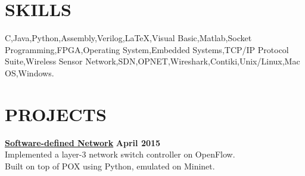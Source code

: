 \documentclass[margin,line]{resume}
\begin{document}
\begin{resume}
\sectionline

    \section{\mysidestyle \textbf{\large{S}\small{KILLS}}}

    C,\hspace{2mm}Java,\hspace{2mm}Python,\hspace{2mm}Assembly,\hspace{2mm}Verilog,\hspace{2mm}\LaTeX,\hspace{2mm}Visual Basic,\hspace{2mm}Matlab,\hspace{2mm}Socket Programming,\hspace{2mm}FPGA,\hspace{2mm}Operating System,\hspace{2mm}Embedded Systems,\hspace{2mm}TCP/IP Protocol Suite,\hspace{2mm}Wireless Sensor Network,\hspace{2mm}SDN,\hspace{2mm}OPNET,\hspace{2mm}Wireshark,\hspace{2mm}Contiki,\hspace{2mm}Unix/Linux,\hspace{2mm}Mac OS,\hspace{2mm}Windows.

\sectionline

    \section{\mysidestyle \textbf{\large{P}\small{ROJECTS}}}

    \textbf{\listing \href{https://github.com/bmyfish/OpenFlow_L3_Learning_Switch}{Software-defined Network}} \hfill \textbf{April 2015}\vspace{2mm}\\
    Implemented a layer-3 network switch controller on OpenFlow.\\
    Built on top of POX using Python, emulated on Mininet.     


\end{resume}
\end{document}
